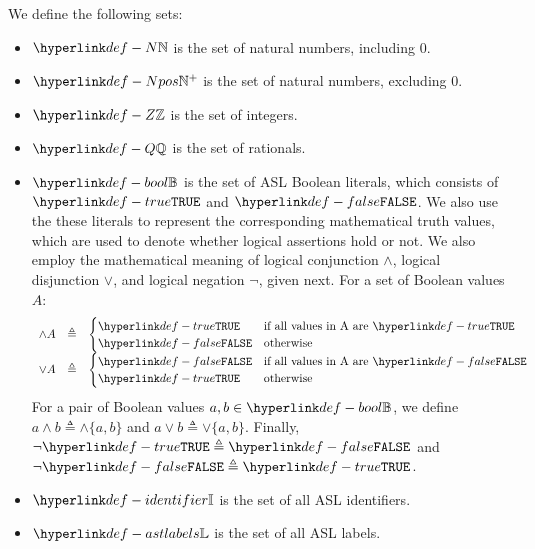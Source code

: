 We define the following sets:
\begin{itemize}
\item \hypertarget{def-N}{
    $\N$ is the set of natural numbers, including $0$.
}

\item \hypertarget{def-Npos}{
    $\Npos$ is the set of natural numbers, excluding $0$.
}

\item
\hypertarget{def-Z}{
    $\Z$ is the set of integers.
}

\item
\hypertarget{def-Q}{
    $\Q$ is the set of rationals.
}

\hypertarget{def-bool}{}
\hypertarget{def-false}{}
\hypertarget{def-true}{}
\item $\Bool$ is the set of ASL Boolean literals, which consists of $\True$ and $\False$.
We also use the these literals to represent the corresponding mathematical truth values,
which are used to denote whether logical assertions hold or not.
We also employ the mathematical meaning of logical conjunction $\land$, logical disjunction $\vee$,
and logical negation $\neg$, given next.
For a set of Boolean values $A$:
\[
  \begin{array}{rcl}
  \land A &\triangleq&
  \begin{cases}
    \True & \text{if all values in A are }\True\\
    \False & \text{otherwise}
  \end{cases}\\
  \vee A &\triangleq&
  \begin{cases}
    \False & \text{if all values in A are }\False\\
    \True & \text{otherwise}
  \end{cases}\\
\end{array}
\]
For a pair of Boolean values $a,b\in\Bool$, we define $a \land b \triangleq \land\{a, b\}$
and $a \vee b \triangleq \vee\{a, b\}$.
Finally, $\neg\True\triangleq\False$ and $\neg\False\triangleq\True$.

\item
\hypertarget{def-identifier}{}
    $\Identifiers$ is the set of all ASL identifiers.

\item
\hypertarget{def-astlabels}{}
    $\astlabels$ is the set of all ASL labels.

\end{itemize}

